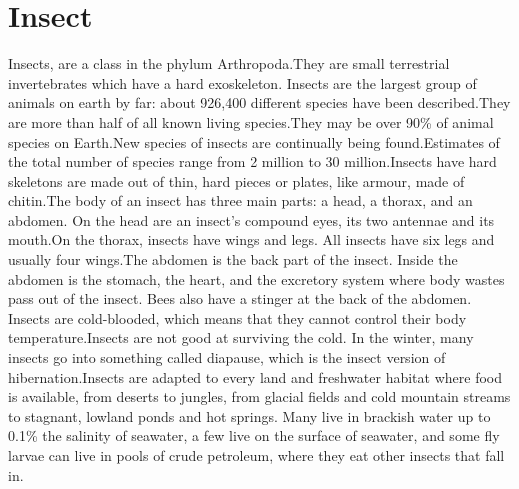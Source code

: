 \documentclass[a4paper, 12pt]{article}
\begin{document}
\section{Insect}
Insects, are a class in the phylum Arthropoda.They are small terrestrial invertebrates which have a hard exoskeleton. Insects are the largest group of animals on earth by far: about 926,400 different species have been described.They are more than half of all known living species.They may be over 90\% of animal species on Earth.New species of insects are continually being found.Estimates of the total number of species range from 2 million to 30 million.Insects have hard skeletons are made out of thin, hard pieces or plates, like armour, made of chitin.The body of an insect has three main parts: a head, a thorax, and an abdomen. On the head are an insect’s compound eyes, its two antennae and its mouth.On the thorax, insects have wings and legs. All insects have six legs and usually four wings.The abdomen is the back part of the insect. Inside the abdomen is the stomach, the heart, and the excretory system where body wastes pass out of the insect. Bees also have a stinger at the back of the abdomen. Insects are cold-blooded, which means that they cannot control their body temperature.Insects are not good at surviving the cold. In the winter, many insects go into something called diapause, which is the insect version of hibernation.Insects are adapted to every land and freshwater habitat where food is available, from deserts to jungles, from glacial fields and cold mountain streams to stagnant, lowland ponds and hot springs. Many live in brackish water up to 0.1\% the salinity of seawater, a few live on the surface of seawater, and some fly larvae can live in pools of crude petroleum, where they eat other insects that fall in.
\end{document}
